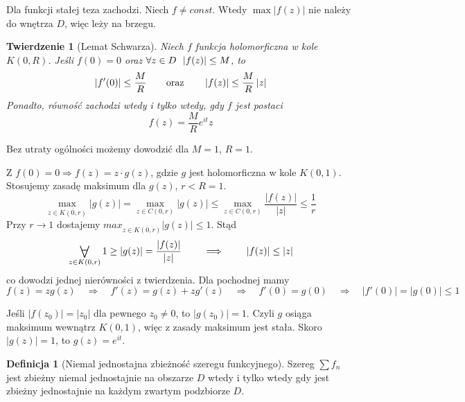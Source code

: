 \documentclass[11pt]{article}
\newcommand{\abs}[1]{\left|#1\right|} %
\newcommand{\closure}[1]{\overline{#1}} %
\newcommand{\Forall}[1]{\mathop{\vcenter{\hbox{\LARGE$\forall$}}}\limits_{#1}} %
\theoremstyle{plain}
\newtheorem*{theorem}{Twierdzenie}
\theoremstyle{definition}
\newtheorem*{definition}{Definicja}
\theoremstyle{remark}
\let\oldendproof\endproof
\renewenvironment{proof}[1][\proofname]{
  \oldproof[\textsc{\small #1}]
}{\oldendproof}
\begin{document}
\begin{proof}
  Dla funkcji stałej teza zachodzi.
  Niech $ f \neq const $.
  Wtedy $ \max\abs{f(z)} $ nie należy do wnętrza $D$, więc leży na brzegu.
\end{proof}

\begin{theorem}[Lemat Schwarza]
  Niech $ f $ funkcja holomorficzna w kole $ K(0, R) $.
  Jeśli $ f(0) = 0 $ oraz $ \forall z \in D\enskip\abs{f(z)} \leq M $, to
  $$
    \abs{f'(0)} \leq \frac{M}{R}
    \qquad \textnormal{oraz} \qquad
    \abs{f(z)} \leq \frac{M}{R}\abs{z}
  $$
  Ponadto, równość zachodzi wtedy i tylko wtedy, gdy $ f $ jest postaci
  $$
    f(z) = \frac{M}{R}e^{it}z
  $$
\end{theorem}

\begin{proof}
  Bez utraty ogólności możemy dowodzić dla $ M = 1 $, $ R = 1 $.

  Z $ f(0) = 0 \Rightarrow f(z) = z \cdot g(z) $, gdzie $g$ jest holomorficzna w kole $ K(0,1) $.
  Stosujemy zasadę maksimum dla $ g(z) $, $ r < R = 1 $.
  $$
    \max_{z \in \closure{K(0, r)}} \abs{g(z)} =
    \max_{z \in C(0, r)} \abs{g(z)}
    \leq \max_{z \in C(0, r)} \frac{\abs{f(z)}}{\abs{z}}
    \leq \frac{1}{r}
  $$
  Przy $ r \to 1 $ dostajemy $ max_{z \in \closure{K(0, r)}} \abs{g(z)} \leq 1 $.
  Stąd
  $$
    \Forall{z \in K(0, r)} 1 \geq \abs{g(z)}
    = \frac{\abs{f(z)}}{\abs{z}}
    \qquad \implies \qquad
    \abs{f(z)} \leq \abs{z}
  $$
  co dowodzi jednej nierówności z twierdzenia.
  Dla pochodnej mamy
  $$
    f(z) = zg(z)
    \quad\Rightarrow\quad
    f'(z) = g(z) + zg'(z)
    \quad\Rightarrow\quad
    f'(0) = g(0)
    \quad\Rightarrow\quad
    \abs{f'(0)} = \abs{g(0)}
    \leq 1
  $$

  Jeśli $ \abs{f(z_0)} = \abs{z_0} $ dla pewnego $ z_0 \neq 0 $, to $ \abs{g(z_0)} = 1 $.
  Czyli $ g $ osiąga maksimum wewnątrz $ K(0, 1) $, więc z zasady maksimum jest stała.
  Skoro $ \abs{g(z)} = 1 $, to $ g(z) = e^{it} $.
\end{proof}

\begin{definition}[Niemal jednostajna zbieżność szeregu funkcyjnego]
  Szereg $ \sum f_{n} $ jest zbieżny niemal jednostajnie na obszarze $D$ wtedy i tylko wtedy gdy jest zbieżny jednostajnie na każdym zwartym podzbiorze $D$.
\end{definition}
\end{document}
